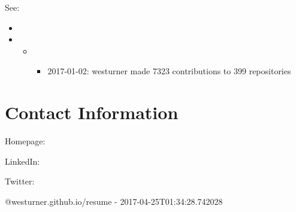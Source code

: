 \documentclass[letter,,openany,oneside,english]{sphinxhowto}
\begin{document}
See:
\begin{itemize}
\item {} 

\item {} 
\begin{itemize}
\item {} 
\begin{itemize}
\item {} 
2017-01-02: \sphinxquotedblleft{}westurner made 7323 contributions to 399 repositories\sphinxquotedblright{}

\end{itemize}

\end{itemize}

\end{itemize}


\section{Contact Information}
\label{\detokenize{resume:contact-information}}
\begin{DUlineblock}{0em}
\item[] Homepage: 
\item[] LinkedIn: 
\item[] Twitter: 
\end{DUlineblock}

@westurner.github.io/resume - 2017-04-25T01:34:28.742028

\renewcommand{\indexname}{Index}
\end{document}
